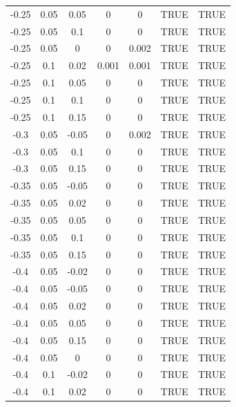 \documentclass[
10pt, %
a4paper, %
oneside, %
headinclude,footinclude, %
BCOR5mm, %
]{scrartcl}
\begin{document}
\begin{table}[H]
\begin{tabular}{|c|c|c|c|c|c|c|}
		-0.25 & 0.05  & 0.05  & 0          & 0         & TRUE       & TRUE      \\
		-0.25 & 0.05  & 0.1   & 0          & 0         & TRUE       & TRUE      \\
		-0.25 & 0.05  & 0     & 0          & 0.002     & TRUE       & TRUE      \\
		-0.25 & 0.1   & 0.02  & 0.001      & 0.001     & TRUE       & TRUE      \\
		-0.25 & 0.1   & 0.05  & 0          & 0         & TRUE       & TRUE      \\
		-0.25 & 0.1   & 0.1   & 0          & 0         & TRUE       & TRUE      \\
		-0.25 & 0.1   & 0.15  & 0          & 0         & TRUE       & TRUE      \\
		-0.3  & 0.05  & -0.05 & 0          & 0.002     & TRUE       & TRUE      \\
		-0.3  & 0.05  & 0.1   & 0          & 0         & TRUE       & TRUE      \\
		-0.3  & 0.05  & 0.15  & 0          & 0         & TRUE       & TRUE      \\
		-0.35 & 0.05  & -0.05 & 0          & 0         & TRUE       & TRUE      \\
		-0.35 & 0.05  & 0.02  & 0          & 0         & TRUE       & TRUE      \\
		-0.35 & 0.05  & 0.05  & 0          & 0         & TRUE       & TRUE      \\
		-0.35 & 0.05  & 0.1   & 0          & 0         & TRUE       & TRUE      \\
		-0.35 & 0.05  & 0.15  & 0          & 0         & TRUE       & TRUE      \\
		-0.4  & 0.05  & -0.02 & 0          & 0         & TRUE       & TRUE      \\
		-0.4  & 0.05  & -0.05 & 0          & 0         & TRUE       & TRUE      \\
		-0.4  & 0.05  & 0.02  & 0          & 0         & TRUE       & TRUE      \\
		-0.4  & 0.05  & 0.05  & 0          & 0         & TRUE       & TRUE      \\
		-0.4  & 0.05  & 0.15  & 0          & 0         & TRUE       & TRUE      \\
		-0.4  & 0.05  & 0     & 0          & 0         & TRUE       & TRUE      \\
		-0.4  & 0.1   & -0.02 & 0          & 0         & TRUE       & TRUE      \\
		-0.4  & 0.1   & 0.02  & 0          & 0         & TRUE       & TRUE      \\

\end{tabular}
\end{table}
\end{document}
